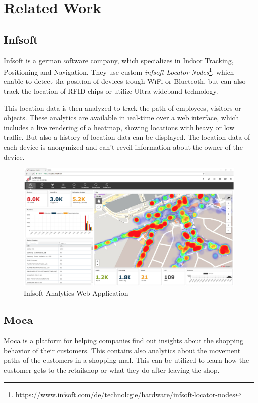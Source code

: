 \section{Related Work}

\subsection{Infsoft}

Infsoft is a german software company, which specializes in Indoor Tracking, Positioning and Navigation. They use custom \emph{infsoft Locator Nodes}\footnote{\url{https://www.infsoft.com/de/technologie/hardware/infsoft-locator-nodes}}, which enable to detect the position of devices trough WiFi or Bluetooth, but can also track the location of RFID chips or utilize Ultra-wideband technology.

This location data is then analyzed to track the path of employees, visitors or objects. These analytics are available in real-time over a web interface, which includes a live rendering of a heatmap, showing locations with heavy or low traffic. But also a history of location data can be displayed. The location data of each device is anonymized and can't reveil information about the owner of the device.

\begin{figure}[!hb]
	\centering
	\includegraphics[width=0.9\linewidth]{images/Infsoft}
	\caption{Infsoft Analytics Web Application}
	\label{fig:InfsoftApplication}
\end{figure}

\subsection{Moca}

Moca is a platform for helping companies find out insights about the shopping behavior of their customers. This contains also analytics about the movement paths of the customers in a shopping mall. 
This can be utilized to learn how the customer gets to the retailshop or what they do after leaving the shop.

